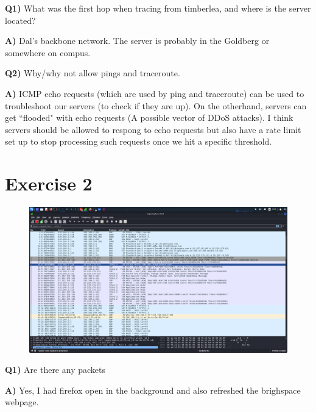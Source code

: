 \documentclass{article}
\numberwithin{equation}{subsection}
\begin{document}
	\begin{adjustwidth}{1em}{1em}	
		\par{
			\textbf{Q1)} What was the first hop when tracing from timberlea, and where is the
			server located?
		}
		
		\par{
			\textbf{A)} Dal's backbone network. The server is probably in the Goldberg or
			somewhere on compus.
		}

		\vspace{10pt}
		\par{
			\textbf{Q2)} Why/why not allow pings and traceroute.
		}

		\par{
			\textbf{A)} ICMP echo requests (which are used by ping and traceroute) can be used
			to troubleshoot our servers (to check if they are up). On the otherhand, servers 
			can get ``flooded"  with echo requests (A possible vector of DDoS attacks). I think 
			servers should be allowed to respong to echo requests but also have a rate limit
			set up to stop processing such requests once we hit a specific threshold.
		}
		
	\end{adjustwidth}


	\newpage
	\section{Exercise 2}
	
	\begin{figure}[H]
		\includegraphics[width=400pt]{pics/4.png}
	\end{figure}
	
	\begin{adjustwidth}{1em}{1em}
		\par{
			\textbf{Q1)} Are there any packets
		}
		\par{
			\textbf{A)} Yes, I had firefox open in the background and also refreshed 
			the brighspace webpage.
		}
	\end{adjustwidth}
\end{document}

